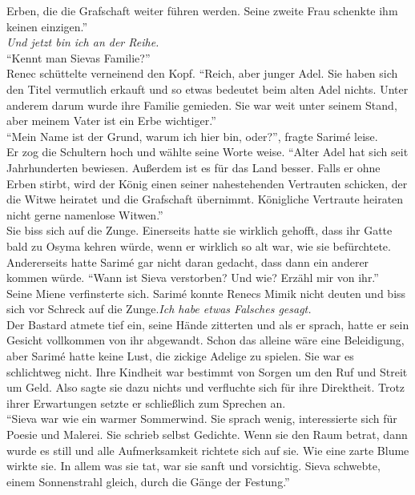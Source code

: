 Erben, die die Grafschaft weiter führen werden. Seine zweite Frau schenkte ihm keinen einzigen.''\\
\textit{Und jetzt bin ich an der Reihe.}\\
``Kennt man Sievas Familie?''\\
Renec schüttelte verneinend den Kopf. ``Reich, aber junger Adel. Sie haben sich den Titel 
vermutlich erkauft und so etwas bedeutet beim alten Adel nichts. Unter anderem darum wurde ihre 
Familie gemieden. Sie war weit unter seinem Stand, aber meinem Vater ist ein Erbe wichtiger.''\\
``Mein Name ist der Grund, warum ich hier bin, oder?'', fragte Sarimé leise.\\
Er zog die Schultern hoch und wählte seine Worte weise. ``Alter Adel hat sich seit Jahrhunderten 
bewiesen. Außerdem ist es für das Land besser. Falls er ohne Erben stirbt, wird der König einen 
seiner nahestehenden Vertrauten schicken, der die Witwe heiratet und die Grafschaft übernimmt. 
Königliche Vertraute heiraten nicht gerne namenlose Witwen.''\\
Sie biss sich auf die Zunge. Einerseits hatte sie wirklich gehofft, dass ihr Gatte bald zu Osyma 
kehren würde, wenn er wirklich so alt war, wie sie befürchtete. Andererseits hatte Sarimé gar nicht 
daran gedacht, dass dann ein anderer kommen würde. ``Wann ist Sieva verstorben? Und wie? Erzähl mir 
von ihr.''\\
Seine Miene verfinsterte sich. Sarimé konnte Renecs Mimik nicht deuten und biss sich vor Schreck 
auf die Zunge.\textit{Ich habe etwas Falsches gesagt.}\\
Der Bastard atmete tief ein, seine Hände zitterten und als er sprach, hatte er sein Gesicht 
vollkommen von ihr abgewandt. Schon das alleine wäre eine Beleidigung, aber Sarimé hatte keine 
Lust, die zickige Adelige zu spielen. Sie war es schlichtweg nicht. Ihre Kindheit war bestimmt von 
Sorgen um den Ruf und Streit um Geld. Also sagte sie dazu nichts und verfluchte sich für ihre 
Direktheit. Trotz ihrer Erwartungen setzte er schließlich zum Sprechen an.\\
``Sieva war wie ein warmer Sommerwind. Sie sprach wenig, interessierte sich für Poesie und Malerei. 
Sie schrieb selbst Gedichte. Wenn sie den Raum betrat, dann wurde es still und alle Aufmerksamkeit 
richtete sich auf sie. Wie eine zarte Blume wirkte sie. In allem was sie tat, war sie sanft und 
vorsichtig. Sieva schwebte, einem Sonnenstrahl gleich, durch die Gänge der Festung.''\\
